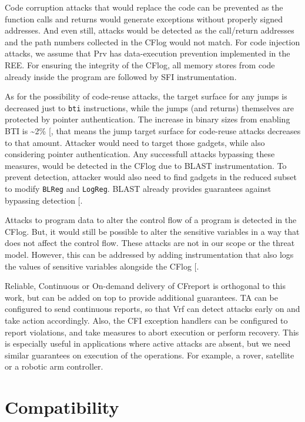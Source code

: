 \documentclass[a4paper, nobind]{templates/ociamthesis}
\begin{document}
Code corruption attacks that would replace the code can be prevented
as the function calls and returns would generate exceptions without properly signed
addresses. And even still, attacks would be detected as the call/return addresses and
the path numbers collected in the CFlog would not match. For code injection attacks,
we assume that Prv has data-execution prevention implemented in the REE.
For ensuring the integrity of the CFlog, all memory stores from code already inside the
program are followed by SFI instrumentation.

As for the possibility of code-reuse attacks, the target surface for any jumps is
decreased just to \texttt{bti} instructions, while the jumps (and returns) themselves are
protected by pointer authentication. The increase in binary sizes from enabling BTI is \textasciitilde2\% {[}\citeproc{ref-arm-pacbti}{9}{]},
that means the jump target surface for code-reuse attacks decreases to that amount.
Attacker would need to target those gadgets, while also considering
pointer authentication. Any successfull attacks bypassing these measures, would
be detected in the CFlog due to BLAST instrumentation. To prevent detection,
attacker would also need to find gadgets in the reduced subset to modify \texttt{BLReg} and \texttt{LogReg}.
BLAST already provides guarantees against bypassing detection {[}\citeproc{ref-blast}{56}{]}.

Attacks to program data to alter the control flow of a program is detected in the CFlog.
But, it would still be possible to alter the sensitive variables in a way that
does not affect the control flow. These attacks are not in our scope or the threat model.
However, this can be addressed by adding instrumentation that also logs the values
of sensitive variables alongside the CFlog {[}\citeproc{ref-sun2020oat}{53}{]}.

Reliable, Continuous or On-demand delivery of CFreport is orthogonal to this work, but can
be added on top to provide additional guarantees. TA can be configured to send
continuous reports, so that Vrf can detect attacks early on and take action accordingly.
Also, the CFI exception handlers can be configured to report violations, and take
measures to abort execution or perform recovery. This is especially useful
in applications where active attacks are absent, but we need similar guarantees on
execution of the operations. For example, a rover, satellite or a robotic arm controller.

\section{Compatibility}\label{compatibility}
\end{document}
